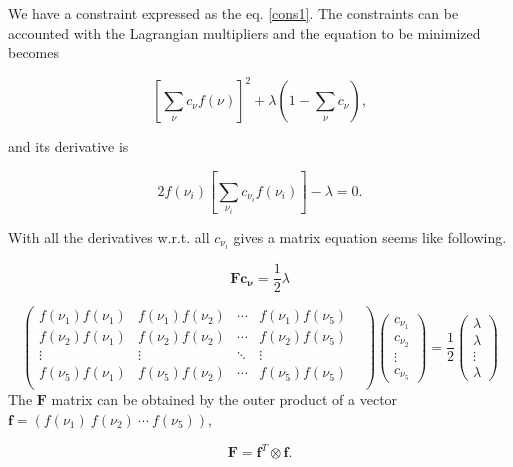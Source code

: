 \documentclass[11pt]{article}
\begin{document}
We have a constraint expressed as the eq. \ref{cons1}. The constraints can be accounted with the Lagrangian multipliers and the equation to be minimized becomes

\begin{equation}\label{mineq2}
    \left[ \sum_\nu c_\nu f(\nu) \right] ^2 + \lambda \left( 1-\sum_\nu c_\nu  \right),
\end{equation}

and its derivative is

\begin{equation}
     2f(\nu_i)\left[ \sum_{\nu_i} c_{\nu_i} f(\nu_i) \right] - \lambda = 0.  
\end{equation}

With all the derivatives w.r.t. all $c_{\nu_i}$ gives a matrix equation seems like following.

\begin{equation}
    \mathbf{F} \mathbf{c_\nu} = \frac{1}{2} \lambda
\end{equation}

\begin{equation}
    \left(
    \begin{matrix}
        f(\nu_1)f(\nu_1) & f(\nu_1)f(\nu_2) & \cdots & f(\nu_1)f(\nu_5) \\
        f(\nu_2)f(\nu_1) & f(\nu_2)f(\nu_2) & \cdots & f(\nu_2)f(\nu_5) \\
        \vdots & \vdots & \ddots & \vdots &  \\
        f(\nu_5)f(\nu_1) & f(\nu_5)f(\nu_2) & \cdots & f(\nu_5)f(\nu_5) \\
    \end{matrix}
    \right)
    \left(
    \begin{matrix}
    c_{\nu_1} \\ c_{\nu_2} \\ \vdots \\ c_{\nu_5}
    \end{matrix}
    \right) =
    \frac{1}{2}
    \left(
    \begin{matrix}
        \lambda \\ \lambda \\ \vdots \\ \lambda 
    \end{matrix}
    \right)
\end{equation}
The $\mathbf{F}$ matrix can be obtained by the outer product of a vector $\mathbf{f}=(f(\nu_1)~f(\nu_2)~\cdots~f(\nu_5))$, 

\begin{equation}
    \mathbf{F} = \mathbf{f}^T \otimes \mathbf{f}.
\end{equation}
\end{document}
